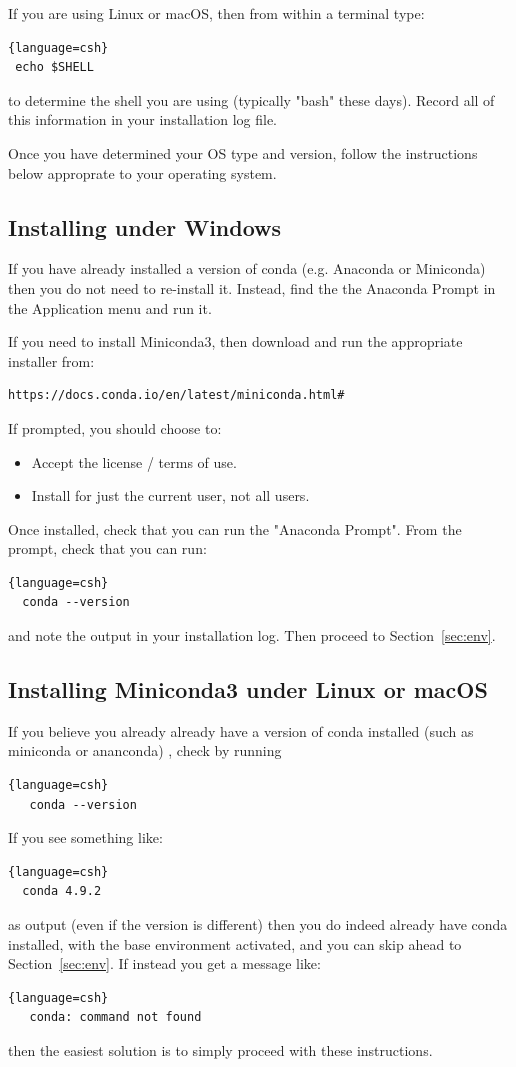 If you are using Linux or macOS, then from within a terminal type:
\begin{lstlisting}{language=csh}
 echo $SHELL
\end{lstlisting}
to determine the shell you are using (typically "bash" these days).
Record all of this information in your installation log file.

Once you have determined your OS type and version, follow the
instructions below approprate to your operating system.

\subsection{Installing under Windows}

If you have already installed a version of conda (e.g. Anaconda or
Miniconda) then you do not need to re-install it.  Instead, find the
the Anaconda Prompt in the Application menu and run it.

If you need to install Miniconda3, then download and run the
appropriate installer from:
\begin{verbatim}
https://docs.conda.io/en/latest/miniconda.html#
\end{verbatim}
If prompted, you should choose to:
\begin{itemize}
 \item Accept the license / terms of use.
 \item Install for just the current user, not all users.
\end{itemize}
 Once installed, check that you can run the "Anaconda Prompt". From
the prompt, check that you can run:
\begin{lstlisting}{language=csh}
  conda --version
\end{lstlisting}
and note the output in your installation log.  Then proceed to
Section~\ref{sec:env}.

\subsection{Installing Miniconda3 under Linux or macOS}

If you believe you already already have a version of conda installed
(such as miniconda or ananconda) , check by running
\begin{lstlisting}{language=csh}
   conda --version
\end{lstlisting}
If you see something like:
\begin{lstlisting}{language=csh}
  conda 4.9.2
\end{lstlisting}
as output (even if the version is different) then you do indeed already have conda
installed, with the base environment activated, and you can skip ahead to
Section~\ref{sec:env}.  If instead you get a message like:
\begin{lstlisting}{language=csh}
   conda: command not found
\end{lstlisting}
then the easiest solution is to simply proceed with these instructions.

